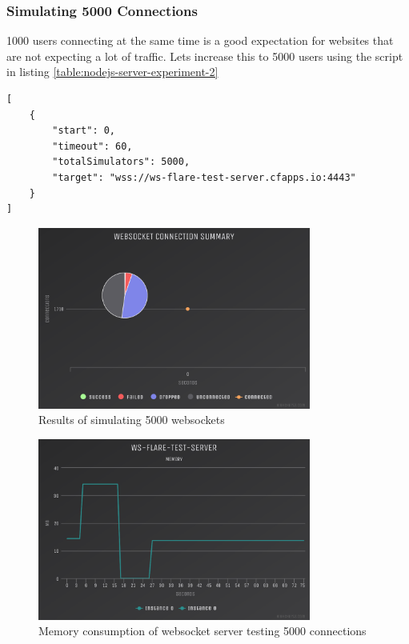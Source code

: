 \subsubsection{Simulating 5000 Connections}

1000 users connecting at the same time is a good expectation for websites that are not expecting a lot of traffic. Lets increase this to 5000 users using the script in listing \ref{table:nodejs-server-experiment-2}

\begin{listing}[H]
    \caption{WS-Flare test script for 5000 users}
    \label{table:nodejs-server-experiment-2}
    \begin{verbatim}
[
    {
        "start": 0,
        "timeout": 60,
        "totalSimulators": 5000,
        "target": "wss://ws-flare-test-server.cfapps.io:4443"
    }
]
\end{verbatim}
\end{listing}

\begin{figure}[H]
  \centering
    \includegraphics[width=0.8\textwidth]{figures/experiments/experiment-1/node-js/conn-summary-5000.png}
    \caption{Results of simulating 5000 websockets}
    \label{fig:experiment-1-conn-summary-5000}
\end{figure}

\begin{figure}[H]
  \centering
    \includegraphics[width=0.8\textwidth]{figures/experiments/experiment-1/node-js/memory-5000.png}
    \caption{Memory consumption of websocket server testing 5000 connections}
    \label{fig:experiment-1-memory-5000}
\end{figure}

